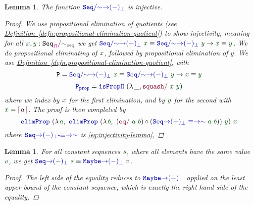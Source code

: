 \documentclass[twoside,11pt,openright]{report}
\theoremstyle{plain} %
\newtheorem{lem}[thm]{Lemma}
\theoremstyle{definition}
\theoremstyle{remark}
\newcommand*{\defref}[1]{\hyperref[defn:#1]{Definition~\ref*{defn:#1}}}
\newcommand*{\term}[1]{\textcolor{green!30!black}{#1}} %
\newcommand*{\type}[1]{\textcolor{magenta!90!black}{#1}}
\newcommand*{\relation}[1]{\textcolor{gray!75!black}{\ensuremath{\mathtt{#1}}}}
\newcommand*{\function}[1]{\textcolor{blue!60!black}{\ensuremath{\mathtt{#1}}}}
\newcommand*{\constructor}[1]{\textcolor{purple!60!black}{\ensuremath{\mathtt{#1}}}}
\newcommand*{\typeformer}[1]{\ensuremath{\mathtt{#1}}}
\newcommand*{\quotientconstructor}[1]{\constructor{[}\,#1\,\constructor{]}}
\begin{document}
\begin{lem}
  \label{lem:sequence-to-partiality-monad-injectivity}
  The function \(\function{Seq/{\sim}{\rightarrow}(-)_\bot}\) is injective.
  \begin{proof}
    We use propositional elimination of quotients (see \defref{propositional-elimination-quotient}) to show injectivity, meaning for all \(\term{x}, \term{y} : \typeformer{Seq}_{\type{R}} / \relation{\sim_{seq}}\) we get \(\function{Seq/{\sim}{\rightarrow}(-)_\bot}~\term{x} \equiv \function{Seq/{\sim}{\rightarrow}(-)_\bot}~\term{y} \rightarrow \term{x} \equiv \term{y}\). We do propositional eliminating of \(\term{x}\), followed by propositional elimination of \(y\). We use \defref{propositional-elimination-quotient}, with
    \begin{equation}
\typeformer{P} = \function{Seq/{\sim}{\rightarrow}(-)_\bot}~\term{x} \equiv \function{Seq/{\sim}{\rightarrow}(-)_\bot}~\term{y} \rightarrow \term{x} \equiv \term{y}
\end{equation}
\begin{equation}
\function{P_{prop}} = \function{isProp\Pi}~(\lambda\,\_, \constructor{squash/}~\term{x}~\term{y})
\end{equation}
where we index by \(\term{x}\) for the first elimination, and by \(\term{y}\) for the second with \(\term{x} = \quotientconstructor{a}\). The proof is then completed by
    \begin{equation}
      \function{elimProp}~(\lambda\,\term{a},~\function{elimProp}~(\lambda\,\term{b},~(\constructor{eq/}~\term{a}~\term{b}) \circ (\function{Seq{\rightarrow}(-)_\bot\text{-}{\equiv}{\rightarrow}{\sim}}~\term{a}~\term{b}))~\term{y})~\term{x}
    \end{equation}
    where \(\function{Seq{\rightarrow}(-)_\bot\text{-}{\equiv}{\rightarrow}{\sim}}\) is \eqref{eq:injectivity-lemma}, 
  \end{proof}
\end{lem}
\begin{lem}
  \label{eq:constant-sequence-equality}
  For all constant sequences \(\term{s}\), where all elements have the same value \(\term{v}\), we get \(\function{Seq{\rightarrow}(-)_\bot}~\term{s} \equiv \function{Maybe{\rightarrow}(-)_\bot}~\term{v}\).
  \begin{proof}
    The left side of the equality reduces to \(\function{Maybe{\rightarrow}(-)_\bot}\) applied on the least upper bound of the constant sequence, which is exactly the right hand side of the equality.
  \end{proof}
\end{lem}
\end{document}
